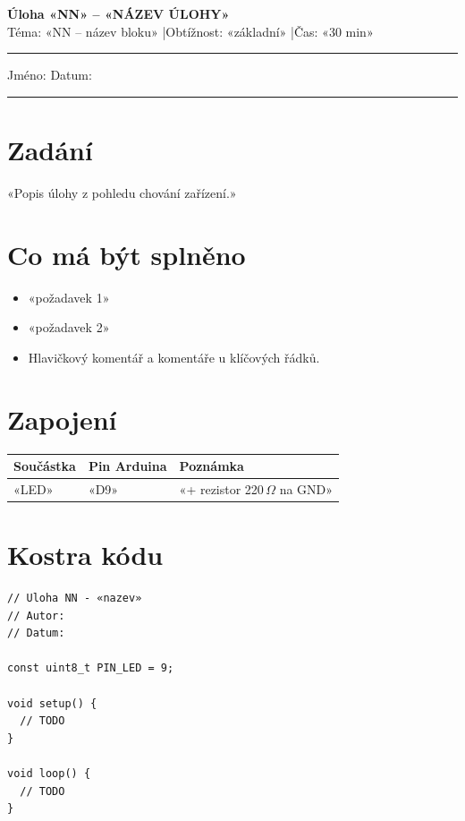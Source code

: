 \documentclass[11pt,a4paper]{article}
\newcommand{\ulohaNazev}{«NÁZEV ÚLOHY»}
\newcommand{\ulohaCislo}{«NN»}
\begin{document}
\noindent
{\Large\bfseries\color{skolaModra} Úloha \ulohaCislo{} -- \ulohaNazev}\\[2pt]
{\small Téma: «NN -- název bloku» \quad|\quad Obtížnost: «základní» \quad|\quad Čas: «30 min»}

\vspace{4mm}
\hrule
\vspace{4mm}

\noindent Jméno: \hrulefill{} \quad Datum: \rule{3cm}{0.4pt}

\section*{Zadání}

«Popis úlohy z pohledu chování zařízení.»

\section*{Co má být splněno}

\begin{itemize}[label=$\square$]
  \item «požadavek 1»
  \item «požadavek 2»
  \item Hlavičkový komentář a komentáře u klíčových řádků.
\end{itemize}

\section*{Zapojení}


\begin{center}
\begin{tabular}{lll}
\toprule
Součástka & Pin Arduina & Poznámka \\
\midrule
«LED» & «D9» & «+ rezistor 220\,$\Omega$ na GND» \\
\bottomrule
\end{tabular}
\end{center}

\section*{Kostra kódu}

\begin{lstlisting}
// Uloha NN - «nazev»
// Autor:
// Datum:

const uint8_t PIN_LED = 9;

void setup() {
  // TODO
}

void loop() {
  // TODO
}
\end{lstlisting}
\end{document}
